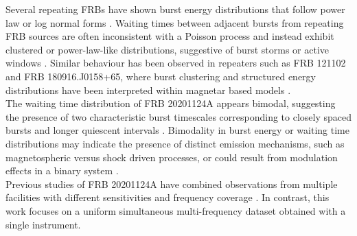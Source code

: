 \documentclass[preprint2, trackchanges]{aastex631}
\begin{document}
Several repeating FRBs have shown burst energy distributions that follow power law or log normal forms \citep{Li2021, Aggarwal_2021, Qin}. Waiting times between adjacent bursts from repeating FRB sources are often inconsistent with a Poisson process and instead exhibit clustered or power-law-like distributions, suggestive of burst storms or active windows \citep{metzger, cruces2020, Oostrum_2020, Xu2022}. Similar behaviour has been observed in repeaters such as FRB 121102 and FRB 180916.J0158+65, where burst clustering and structured energy distributions have been interpreted within magnetar based models \citep{Li2021, Nimmo2022}.
\\
The waiting time distribution of FRB 20201124A appears bimodal, suggesting the presence of two characteristic burst timescales corresponding to closely spaced bursts and longer quiescent intervals \citep{Zhang_2022, Xu2022}. Bimodality in burst energy or waiting time distributions may indicate the presence of distinct emission mechanisms, such as magnetospheric versus shock driven processes, or could result from modulation effects in a binary system \citep{Li2021, 2025arXiv250216626L}.
\\
Previous studies of FRB 20201124A have combined observations from multiple facilities with different sensitivities and frequency coverage \citep{Xu2022, Lanman_2022, Kirsten2024, Hilmarsson_2021, Zhang_2022}. In contrast, this work focuses on a uniform simultaneous multi-frequency dataset obtained with a single instrument. %
\end{document}
